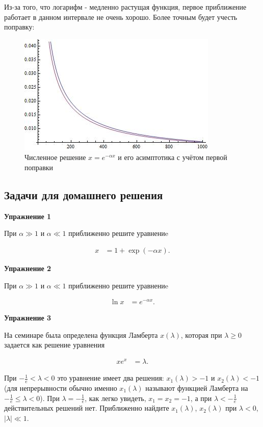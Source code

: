 \documentclass[a4paper,12pt]{article}
\begin{document}
Из-за того, что логарифм - медленно растущая функция, первое приближение работает в данном интервале не очень хорошо. Более точным будет учесть поправку: 
\begin{figure}[h]
	\caption{Численное решение $x=e^{-\alpha x}$ и его асимптотика с учётом первой поправки}
	\centering
	\includegraphics[width=0.65\columnwidth]{product_log.jpg}
\end{figure}

\newpage

\subsection{Задачи для домашнего решения}

\noindent \textbf{Упражнение 1}

\noindent При $\alpha\gg 1$ и $\alpha\ll 1$ приближенно решите уравнениe

\noindent 
\begin{align*}
x & =1+\exp(-\alpha x).
\end{align*}

\vspace{15pt}
\noindent \textbf{Упражнение 2}

\noindent При $\alpha\gg 1$ и $\alpha\ll 1$ приближенно решите уравнениe

\noindent 
\begin{align*}
\ln x & =e^{-\alpha x}.
\end{align*}

\vspace{15pt}
\noindent \textbf{Упражнение 3}

\noindent На семинаре была определена функция Ламберта $x(\lambda)$, которая при $\lambda\geq 0$ задается как решение уравнения

\noindent 
\begin{align*}
xe^{x} & =\lambda.
\end{align*}

\noindent При $-\frac{1}{e}<\lambda<$0 это уравнение имеет два решения: $x_{1}(\lambda)>-1$ и $x_{2}(\lambda)<-1$ (для непрерывности обычно именно $x_{1}(\lambda)$ называют функцией Ламберта на $-\frac{1}{e}\leq\lambda<0$). При $\lambda=-\frac{1}{e}$, как легко увидеть, $ x_{1}=x_{2}=-1$, а при $\lambda<-\frac{1}{e}$ действительных решений нет. Приближенно найдите $x_{1}(\lambda)$, $x_{2}(\lambda)$ при $\lambda<0$, $|\lambda|\ll 1$. 
\end{document}
